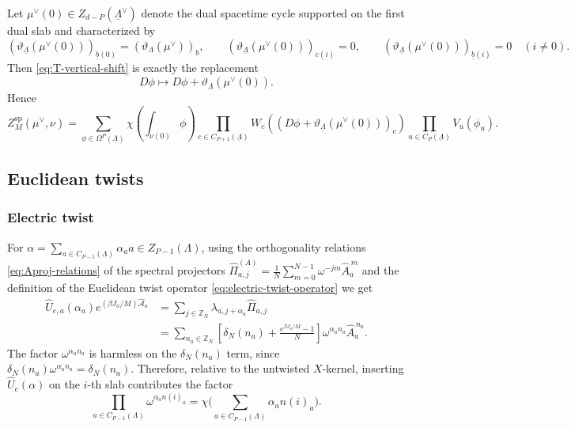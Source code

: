 Let \(\mu^\vee(0)\in Z_{d-P}(\underline\Lambda^\vee)\) denote the dual spacetime cycle
supported on the first dual slab and characterized by
\begin{equation}
	\left(\vartheta_{\underline\Lambda}(\mu^\vee(0))\right)_{\underline b(0)}
	=
	(\vartheta_\Lambda(\mu^\vee))_b,
	\qquad
	\left(\vartheta_{\underline\Lambda}(\mu^\vee(0))\right)_{c(i)}=0,
	\qquad
	\left(\vartheta_{\underline\Lambda}(\mu^\vee(0))\right)_{\underline b(i)}=0
	\quad(i\neq 0).
	\label{eq:mu0-cocycle}
\end{equation}
Then \eqref{eq:T-vertical-shift} is exactly the replacement
\begin{equation}
	D\phi
	\mapsto
	D\phi+\vartheta_{\underline\Lambda}(\mu^\vee(0)).
\end{equation}
Hence
\begin{equation}
	Z_M^{\mathrm{sp}}(\mu^\vee,\nu)
	=
	\sum_{\phi\in\Omega^P(\underline\Lambda)}
	\chi\left(\int_{\nu(0)}\phi\right)
	\prod_{c\in C_{P+1}(\underline\Lambda)}
	W_c\left((D\phi+\vartheta_{\underline\Lambda}(\mu^\vee(0)))_c\right)
	\prod_{u\in C_P(\underline\Lambda)}
	V_u(\phi_u).
	\label{eq:spatial-insertions-spacetime}
\end{equation}


\subsection{Euclidean twists}
\label{app:TrTwists}
\subsubsection{Electric twist}
\label{app:electric-twist}

For $\alpha=\sum_{a \in C_{P-1}(\Lambda)} \alpha_a a \in Z_{P-1}(\Lambda)$, using the orthogonality relations \eqref{eq:Aproj-relations} of the spectral projectors $\hat\Pi_{a,j}^{(A)} = \frac1N\sum_{m=0}^{N-1}\omega^{-jm}\hat A_a^{\,m}$ and the definition of the Euclidean twist operator \eqref{eq:electric-twist-operator} we get
\begin{align}
	\hat U_{e,a}(\alpha_a)e^{(\beta J_a/M)\hat{\mathcal A}_a}
	&=
	\sum_{j\in\mathbb Z_N}\lambda_{a,j+\alpha_a}\hat\Pi_{a,j}
	\nonumber\\
	&=
	\sum_{n_a\in\mathbb Z_N}
	\left[
	\delta_N(n_a)+\frac{e^{\beta J_a/M}-1}{N}
	\right]
	\omega^{\alpha_a n_a}\hat A_a^{\,n_a}.
	\label{eq:Ue-shift}
\end{align}
The factor \(\omega^{\alpha_a n_a}\) is harmless on the \(\delta_N(n_a)\) term, since
\(\delta_N(n_a)\omega^{\alpha_a n_a}=\delta_N(n_a)\). Therefore, relative to the untwisted
\(X\)-kernel, inserting \(\hat U_e(\alpha)\) on the \(i\)-th slab contributes the factor
\begin{equation}
	\prod_{a\in C_{P-1}(\Lambda)}\omega^{\alpha_a n(i)_a}
	=
	\chi\Biggl(\sum_{a\in C_{P-1}(\Lambda)}\alpha_a n(i)_a\Biggr).
	\label{eq:electric-slab-factor}
\end{equation}

